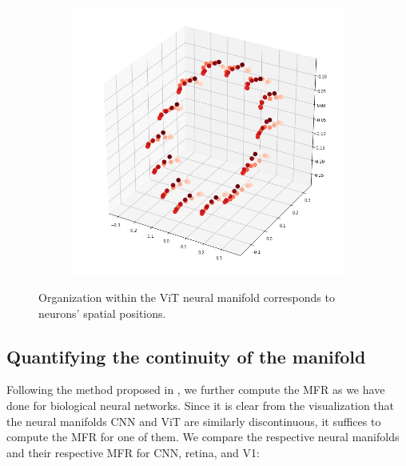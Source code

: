\begin{figure}[H]
\begin{subfigure}[b]{0.3\textwidth}
\end{subfigure}
\hfill
\begin{subfigure}[b]{0.3\textwidth}
    \includegraphics[width=\textwidth]{figures/embeddings/vit-spatial2.png}
\end{subfigure}
\caption{Organization within the ViT neural manifold corresponds to neurons' spatial positions.}
\end{figure}

\subsection{Quantifying the continuity of the manifold}

Following the method proposed in \cite{dyballa_manifold_2021}, we further compute the MFR as we have done for biological neural networks. Since it is clear from the visualization that the neural manifolds CNN and ViT are similarly discontinuous, it suffices to compute the MFR for one of them. We compare the respective neural manifolds and their respective MFR for CNN, retina, and V1:


